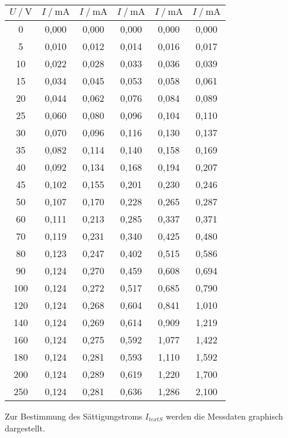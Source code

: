 \begin{table}
\begin{tabular}{c c c c c c}
    $U \mathbin{/} \unit{\volt}$ &
    $I \mathbin{/} \unit{\milli\ampere}$ &
    $I \mathbin{/} \unit{\milli\ampere}$ &
    $I \mathbin{/} \unit{\milli\ampere}$ & 
    $I \mathbin{/} \unit{\milli\ampere}$ &
    $I \mathbin{/} \unit{\milli\ampere}$ \\
    \midrule
       0 & 0,000 &   0,000 &   0,000 &   0,000 &   0,000 \\
       5 & 0,010 &   0,012 &   0,014 &   0,016 &   0,017 \\
      10 & 0,022 &   0,028 &   0,033 &   0,036 &   0,039 \\
      15 & 0,034 &   0,045 &   0,053 &   0,058 &   0,061 \\
      20 & 0,044 &   0,062 &   0,076 &   0,084 &   0,089 \\
      25 & 0,060 &   0,080 &   0,096 &   0,104 &   0,110 \\
      30 & 0,070 &   0,096 &   0,116 &   0,130 &   0,137 \\
      35 & 0,082 &   0,114 &   0,140 &   0,158 &   0,169 \\
      40 & 0,092 &   0,134 &   0,168 &   0,194 &   0,207 \\
      45 & 0,102 &   0,155 &   0,201 &   0,230 &   0,246 \\
      50 & 0,107 &   0,170 &   0,228 &   0,265 &   0,287 \\
      60 & 0,111 &   0,213 &   0,285 &   0,337 &   0,371 \\
      70 & 0,119 &   0,231 &   0,340 &   0,425 &   0,480 \\
      80 & 0,123 &   0,247 &   0,402 &   0,515 &   0,586 \\
      90 & 0,124 &   0,270 &   0,459 &   0,608 &   0,694 \\
     100 & 0,124 &   0,272 &   0,517 &   0,685 &   0,790 \\
     120 & 0,124 &   0,268 &   0,604 &   0,841 &   1,010 \\
     140 & 0,124 &   0,269 &   0,614 &   0,909 &   1,219 \\
     160 & 0,124 &   0,275 &   0,592 &   1,077 &   1,422 \\
     180 & 0,124 &   0,281 &   0,593 &   1,110 &   1,592 \\
     200 & 0,124 &   0,289 &   0,619 &   1,220 &   1,700 \\
     250 & 0,124 &   0,281 &   0,636 &   1,286 &   2,100 \\
  \bottomrule
  \end{tabular}
\end{table}

Zur Bestimmung des Sättigungstroms $I_{text{S}}$ werden die Messdaten graphisch dargestellt.

